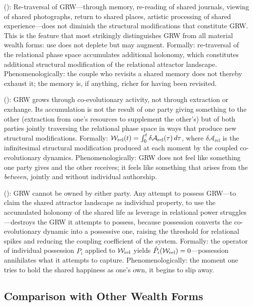  (): Re-traversal of GRW---through memory, re-reading of shared journals, viewing of shared photographs, return to shared places, artistic processing of shared experience---does not diminish the structural modifications that constitute GRW. This is the feature that most strikingly distinguishes GRW from all material wealth forms: use does not deplete but may augment. Formally: re-traversal of the relational phase space accumulates additional holonomy, which constitutes additional structural modification of the relational attractor landscape. Phenomenologically: the couple who revisits a shared memory does not thereby exhaust it; the memory is, if anything, richer for having been revisited.

 (): GRW grows through co-evolutionary activity, not through extraction or exchange. Its accumulation is not the result of one party giving something to the other (extraction from one's resources to supplement the other's) but of both parties jointly traversing the relational phase space in ways that produce new structural modifications. Formally: $\mathcal{W}_{\mathrm{rel}}(t) = \int_0^t \delta\mathcal{A}_{\mathrm{rel}}(\tau) \, d\tau$, where $\delta\mathcal{A}_{\mathrm{rel}}$ is the infinitesimal structural modification produced at each moment by the coupled co-evolutionary dynamics. Phenomenologically: GRW does not feel like something one party gives and the other receives; it feels like something that arises from the \emph{between}, jointly and without individual authorship.

 (): GRW cannot be owned by either party. Any attempt to possess GRW---to claim the shared attractor landscape as individual property, to use the accumulated holonomy of the shared life as leverage in relational power struggles---destroys the GRW it attempts to possess, because possession converts the co-evolutionary dynamic into a possessive one, raising the threshold for relational spikes and reducing the coupling coefficient of the system. Formally: the operator of individual possession $\hat{P}_i$ applied to $\mathcal{W}_{\mathrm{rel}}$ yields $\hat{P}_i(\mathcal{W}_{\mathrm{rel}}) = 0$---possession annihilates what it attempts to capture. Phenomenologically: the moment one tries to hold the shared happiness as one's own, it begins to slip away.

\subsection{Comparison with Other Wealth Forms}
\label{p15:subsec:comparison}

